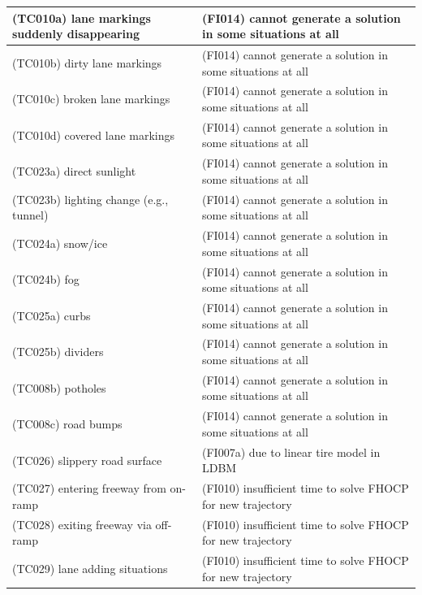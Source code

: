 \begin{longtable}{|p{8cm}|p{8cm}|}
\cellcolor{cYellow}(TC010a) lane markings suddenly disappearing& \cellcolor{cBlue}(FI014) cannot generate a solution in some situations at all\\\hline
\cellcolor{cYellow}(TC010b) dirty lane markings& \cellcolor{cBlue}(FI014) cannot generate a solution in some situations at all\\\hline
\cellcolor{cYellow}(TC010c) broken lane markings& \cellcolor{cBlue}(FI014) cannot generate a solution in some situations at all\\\hline
\cellcolor{cYellow}(TC010d) covered lane markings& \cellcolor{cBlue}(FI014) cannot generate a solution in some situations at all\\\hline
\cellcolor{cRed}(TC023a) direct sunlight& \cellcolor{cBlue}(FI014) cannot generate a solution in some situations at all\\\hline
\cellcolor{cRed}(TC023b) lighting change (e.g., tunnel)& \cellcolor{cBlue}(FI014) cannot generate a solution in some situations at all\\\hline
\cellcolor{cRed}(TC024a) snow/ice& \cellcolor{cBlue}(FI014) cannot generate a solution in some situations at all\\\hline
\cellcolor{cRed}(TC024b) fog& \cellcolor{cBlue}(FI014) cannot generate a solution in some situations at all\\\hline
\cellcolor{cViolet}(TC025a) curbs& \cellcolor{cBlue}(FI014) cannot generate a solution in some situations at all\\\hline
\cellcolor{cViolet}(TC025b) dividers& \cellcolor{cBlue}(FI014) cannot generate a solution in some situations at all\\\hline
\cellcolor{cRed}(TC008b) potholes& \cellcolor{cBlue}(FI014) cannot generate a solution in some situations at all\\\hline
\cellcolor{cRed}(TC008c) road bumps& \cellcolor{cBlue}(FI014) cannot generate a solution in some situations at all\\\hline
\cellcolor{cRed}(TC026) slippery road surface& \cellcolor{cBlue}(FI007a) due to linear tire model in LDBM\\\hline
\cellcolor{cYellow}(TC027) entering freeway from on-ramp& \cellcolor{cBlue}(FI010) insufficient time to solve FHOCP for new trajectory\\\hline
\cellcolor{cYellow}(TC028) exiting freeway via off-ramp& \cellcolor{cBlue}(FI010) insufficient time to solve FHOCP for new trajectory\\\hline
\cellcolor{cYellow}(TC029) lane adding situations& \cellcolor{cBlue}(FI010) insufficient time to solve FHOCP for new trajectory\\\hline

\end{longtable}
